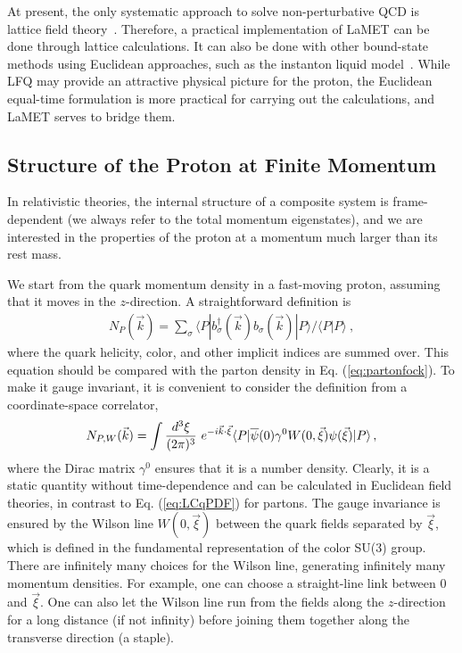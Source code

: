 At present, the only systematic approach to solve non-perturbative QCD
is lattice field theory~\cite{Wilson:1974sk}. Therefore,
a practical implementation of LaMET can be done
through lattice calculations.  It can also be done
with other bound-state methods using Euclidean approaches, such as the
instanton liquid model~\cite{Schafer:1996wv}. While LFQ may provide an attractive physical picture for the proton,
the Euclidean equal-time formulation is more practical for carrying out the
calculations, and LaMET serves to bridge them.

\subsection{Structure of the Proton at Finite Momentum}
\label{sec:lamet-frame}
In relativistic theories, the internal structure of
a composite system is frame-dependent (we always refer to the total momentum eigenstates),
and we are interested in the properties of the proton
at a momentum much larger than its rest mass.

We start from the quark momentum density in a fast-moving proton, assuming that it moves in the $z$-direction. A
straightforward definition is
\begin{align}
	N_P(\vec{k})=\sum_\sigma \langle P|b^\dagger_\sigma (\vec{k}) b_\sigma
	(\vec{k})|P\rangle/\langle P|P\rangle \ ,
\end{align}
where the quark helicity, color, and other implicit indices are summed over.
This equation should be compared with the parton density in Eq. (\ref{eq:partonfock}).
To make it gauge invariant, it is convenient to consider
the definition from a coordinate-space correlator,
\begin{align}
	N_{P,W}(\vec{k})=\int {d^3\xi\over {(2\pi)^3}} \ e^{-i\vec{k}\cdot \vec{\xi}}
	\langle P|\overline{\psi}(0)\gamma^0W(0,\vec{\xi})\psi(\vec{\xi})|P\rangle\,,
\end{align}
where the Dirac matrix $\gamma^0$ ensures that it is a number density. Clearly,
it is a static quantity without time-dependence and can be calculated
in Euclidean field theories, in contrast to Eq. (\ref{eq:LCqPDF}) for partons.
The gauge invariance is ensured by the Wilson line $W(0,\vec{\xi})$
between the quark fields separated by $\vec{\xi}$, which is defined in the fundamental representation of the color SU(3) group. There are infinitely many
choices for the Wilson line, generating infinitely many momentum densities.
For example, one can choose a straight-line link between $0$ and $\vec{\xi}$.
One can also let the Wilson line run from the fields along the $z$-direction for
a long distance (if not infinity) before joining them together along
the transverse direction (a staple).

